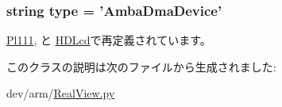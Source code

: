 \label{classRealView_1_1AmbaDmaDevice_ac3f272675842a6662ce8782e10fdba39}
\hypertarget{classRealView_1_1AmbaDmaDevice_acce15679d830831b0bbe8ebc2a60b2ca}{
\subsubsection[{type}]{\setlength{\rightskip}{0pt plus 5cm}string {\bf type} = '{\bf AmbaDmaDevice}'}}
\label{classRealView_1_1AmbaDmaDevice_acce15679d830831b0bbe8ebc2a60b2ca}


\hyperlink{classRealView_1_1Pl111_acce15679d830831b0bbe8ebc2a60b2ca}{Pl111}, と \hyperlink{classRealView_1_1HDLcd_acce15679d830831b0bbe8ebc2a60b2ca}{HDLcd}で再定義されています。

このクラスの説明は次のファイルから生成されました:\begin{DoxyCompactItemize}
\item 
dev/arm/\hyperlink{RealView_8py}{RealView.py}\end{DoxyCompactItemize}
